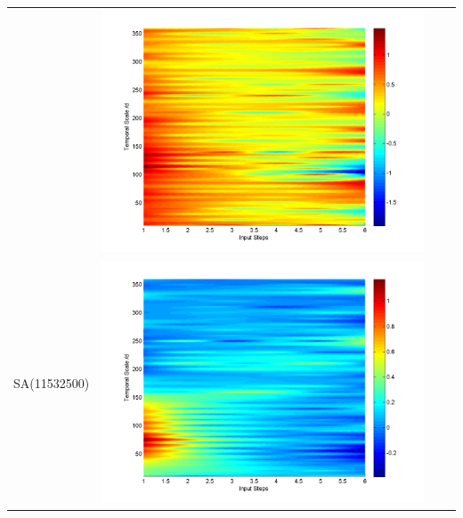 \documentclass[11pt]{article}
\begin{document}
\begin{table}[H]
{\begin{tabular}{cccc}
&\begin{minipage}{.3\textwidth}\includegraphics[width=\linewidth]{resultgraph/05585000qdiff_former.png}\end{minipage}
\\
SA(11532500)
&\begin{minipage}{.3\textwidth}\includegraphics[width=\linewidth]{resultgraph/11532500pdiff_former.png}\end{minipage}

\end{tabular}}
\end{table}
\end{document}
